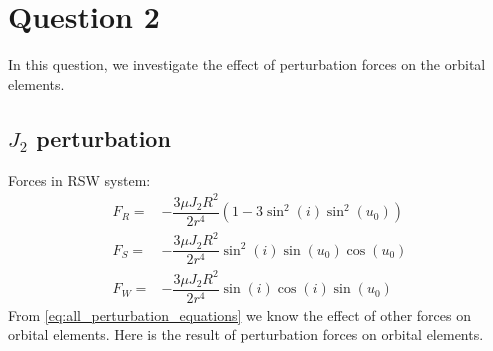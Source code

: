 \section{Question 2}
In this question, we investigate the effect of perturbation forces on the orbital elements.
\subsection{$J_2$ perturbation}

Forces in RSW system:
\begin{equation}
    \begin{aligned}
        F_R = & -\dfrac{3\mu J_2 R^2}{2r^4}\left(1-3\sin^2(i)\sin^2(u_0)\right)\\
        F_S = & -\dfrac{3\mu J_2 R^2}{2r^4}\sin^2(i)\sin(u_0)\cos(u_0)\\
        F_W = & -\dfrac{3\mu J_2 R^2}{2r^4}\sin(i)\cos(i)\sin(u_0)
    \end{aligned}
\end{equation}
From \eqref{eq:all_perturbation_equations} we know the effect of other forces on orbital elements. Here is the result of perturbation forces on orbital elements.